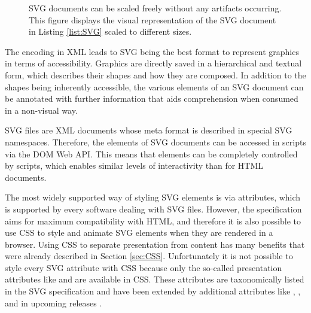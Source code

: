 \begin{figure}[tp]
\centering
{}
\caption[SVG Scaling]{
  SVG documents can be scaled freely without any artifacts occurring. 
  This figure displays the visual representation of the SVG document in Listing \ref{list:SVG} scaled to different sizes. 
}
\label{fig:SVG}
\end{figure}

The encoding in XML leads to SVG being the best format to represent graphics in terms of accessibility. 
Graphics are directly saved in a hierarchical and textual form, which describes their shapes and how they are composed. 
In addition to the shapes being inherently accessible, the various elements of an SVG document can be annotated with further information that aids comprehension when consumed in a non-visual way.

SVG files are XML documents whose meta format is described in special SVG namespaces. 
Therefore, the elements of SVG documents can be accessed in scripts via the DOM Web API. 
This means that elements can be completely controlled by scripts, which enables similar levels of interactivity than for HTML documents.

The most widely supported way of styling SVG elements is via attributes, which is supported by every software dealing with SVG files. 
However, the specification aims for maximum compatibility with HTML, and therefore it is also possible to use CSS to style and animate SVG elements when they are rendered in a browser. 
Using CSS to separate presentation from content has many benefits that were already described in Section \ref{sec:CSS}.
Unfortunately it is not possible to style every SVG attribute with CSS because only the so-called presentation attributes like  and  are available in CSS. 
These attributes are taxonomically listed in the SVG specification \parencite{SVG11} and have been extended by additional attributes like , ,  and  in upcoming releases \parencite{SVG2}.

